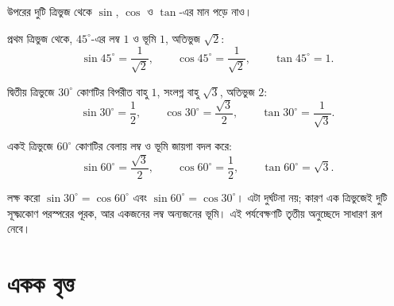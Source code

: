\documentclass[11pt]{article}
\begin{document}
\begin{center}
\end{center}

\begin{example}
উপরের দুটি ত্রিভুজ থেকে $\sin$, $\cos$ ও $\tan$-এর মান পড়ে নাও।
\end{example}

\begin{solbox}
প্রথম ত্রিভুজ থেকে, $45^\circ$-এর লম্ব $1$ ও ভূমি $1$, অতিভুজ $\sqrt{2}$:
\[
  \sin 45^\circ = \frac{1}{\sqrt{2}}, \qquad
  \cos 45^\circ = \frac{1}{\sqrt{2}}, \qquad
  \tan 45^\circ = 1 .
\]

দ্বিতীয় ত্রিভুজে $30^\circ$ কোণটির বিপরীত বাহু $1$, সংলগ্ন বাহু $\sqrt{3}$,
অতিভুজ $2$:
\[
  \sin 30^\circ = \frac{1}{2}, \qquad
  \cos 30^\circ = \frac{\sqrt{3}}{2}, \qquad
  \tan 30^\circ = \frac{1}{\sqrt{3}} .
\]

একই ত্রিভুজে $60^\circ$ কোণটির বেলায় লম্ব ও ভূমি জায়গা বদল করে:
\[
  \sin 60^\circ = \frac{\sqrt{3}}{2}, \qquad
  \cos 60^\circ = \frac{1}{2}, \qquad
  \tan 60^\circ = \sqrt{3} .
\]

লক্ষ করো $\sin 30^\circ = \cos 60^\circ$ এবং $\sin 60^\circ = \cos 30^\circ$।
এটা দুর্ঘটনা নয়; কারণ এক ত্রিভুজেই দুটি সূক্ষ্মকোণ পরস্পরের পূরক, আর একজনের
লম্ব অন্যজনের ভূমি। এই পর্যবেক্ষণটি তৃতীয় অনুচ্ছেদে সাধারণ রূপ নেবে।
\end{solbox}

\section{একক বৃত্ত}
\end{document}
